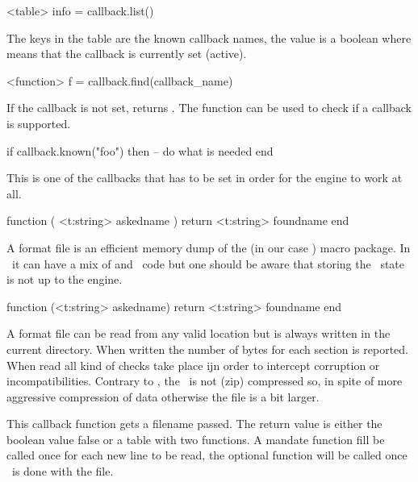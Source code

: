 \starttyping[option=LUA]
<table> info = callback.list()
\stoptyping

The keys in the table are the known callback names, the value is a boolean where
 means that the callback is currently set (active).

\starttyping[option=LUA]
<function> f = callback.find(callback_name)
\stoptyping

If the callback is not set,  returns . The 
function can be used to check if a callback is supported.

\starttyping[option=LUA]
if callback.known("foo") then
    -- do what is needed
end
\stoptyping

\stopsection

\startsection[title=Files]

\startsubsection[title=find_log_file]

This is one of the callbacks that has to be set in order for the engine to work
at all.

\starttyping[option=LUA]
function (
    <t:string> askedname
)
    return <t:string> foundname
end
\stoptyping

\stopsubsection

\startsubsection[title=find_format_file]

A format file is an efficient memory dump of the (in our case \CONTEXT) macro
package. In \LUATEX\ it can have a mix of \TEX and \LUA\ code but one should be
aware that storing the \LUA\ state is not up to the engine.

\starttyping[option=LUA]
function (<t:string> askedname)
    return <t:string> foundname
end
\stoptyping

A format file can be read from any valid location but is always written in the
current directory. When written the number of bytes for each section is reported.
When read all kind of checks take place ijn order to intercept corruption or
incompatibilities. Contrary to \LUATEX, the \LUAMETATEX\ is not (zip) compressed so,
in spite of more aggressive compression of data otherwise the file is a bit larger.

\stopsubsection

\startsubsection[title=open_data_file]

This callback function gets a filename passed. The return value is either the boolean
value false or a table with two functions. A mandate  function fill be
called once for each new line to be read, the optional  function will
be called once \LUATEX\ is done with the file.

